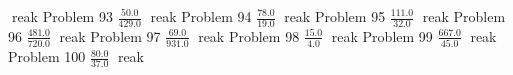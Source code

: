 \documentclass{article}
\begin{document}
\hfill reak
Problem 93
\newline
\hfill \break
$\displaystyle \frac{50.0}{429.0}$
\newline
\hfill reak
Problem 94
\newline
\hfill \break
$\displaystyle \frac{78.0}{19.0}$
\newline
\hfill reak
Problem 95
\newline
\hfill \break
$\displaystyle \frac{111.0}{32.0}$
\newline
\hfill reak
Problem 96
\newline
\hfill \break
$\displaystyle \frac{481.0}{720.0}$
\newline
\hfill reak
Problem 97
\newline
\hfill \break
$\displaystyle \frac{69.0}{931.0}$
\newline
\hfill reak
Problem 98
\newline
\hfill \break
$\displaystyle \frac{15.0}{4.0}$
\newline
\hfill reak
Problem 99
\newline
\hfill \break
$\displaystyle \frac{667.0}{45.0}$
\newline
\hfill reak
Problem 100
\newline
\hfill \break
$\displaystyle \frac{80.0}{37.0}$
\newline
\hfill reak
\end{document}
